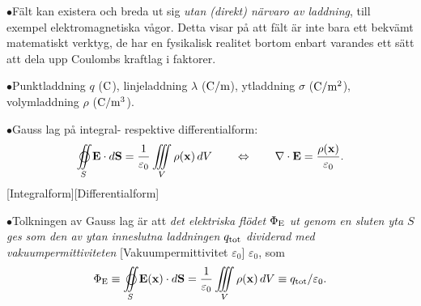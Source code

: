 \item{$\bullet$}{F{\"a}lt kan existera och breda ut sig {\it utan
  (direkt) n{\"a}rvaro av laddning}, till exempel elektromagnetiska
  v{\aa}gor. Detta visar p{\aa} att f{\"a}lt {\"a}r inte bara ett
  bekv{\"a}mt matematiskt verktyg, de har en fysikalisk realitet
  bortom enbart varandes ett s{\"a}tt att dela upp Coulombs kraftlag
  i faktorer.}
\item{$\bullet$}{Punktladdning $q$ (${\rm C}$),
  linjeladdning $\lambda$ (${\rm C}/{\rm m}$),
  ytladdning $\sigma$ (${\rm C}/{\rm m}^2$),
  volymladdning $\rho$ (${\rm C}/{\rm m}^3$).}
\item{$\bullet$}{Gauss lag p{\aa} integral- respektive differentialform:
  $$
    \oiint_S {\bf E}\cdot d{\bf S}
       ={{1}\over{\varepsilon_0}}\iiint_V\rho({\bf x})\,dV
    \qquad\Leftrightarrow\qquad
    \nabla\cdot{\bf E}={{\rho({\bf x})}\over{\varepsilon_0}}.
  $$[Integralform][Differentialform]}
\item{$\bullet$}{Tolkningen av Gauss lag {\"a}r att {\it det elektriska
  fl{\"o}det $\Phi_{\rm E}$ ut genom en sluten yta $S$ ges som den av ytan
  inneslutna laddningen $q_{\rm tot}$ dividerad med vakuumpermittiviteten}
  [Vakuumpermittivitet $\varepsilon_0$]
  $\varepsilon_0$, som
  $$
    \Phi_{\rm E}
       \equiv\oiint_S {\bf E}({\bf x})\cdot d{\bf S}
       ={{1}\over{\varepsilon_0}}\iiint_V\rho({\bf x})\,dV
       \equiv q_{\rm tot}/\varepsilon_0.
  $$}
\index
\bye
